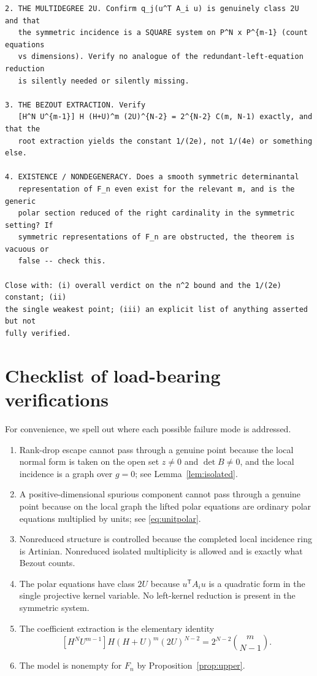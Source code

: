 \documentclass[11pt]{article}
\theoremstyle{plain}
\theoremstyle{definition}
\begin{document}
\begin{verbatim}
2. THE MULTIDEGREE 2U. Confirm q_j(u^T A_i u) is genuinely class 2U and that
   the symmetric incidence is a SQUARE system on P^N x P^{m-1} (count equations
   vs dimensions). Verify no analogue of the redundant-left-equation reduction
   is silently needed or silently missing.

3. THE BEZOUT EXTRACTION. Verify
   [H^N U^{m-1}] H (H+U)^m (2U)^{N-2} = 2^{N-2} C(m, N-1) exactly, and that the
   root extraction yields the constant 1/(2e), not 1/(4e) or something else.

4. EXISTENCE / NONDEGENERACY. Does a smooth symmetric determinantal
   representation of F_n even exist for the relevant m, and is the generic
   polar section reduced of the right cardinality in the symmetric setting? If
   symmetric representations of F_n are obstructed, the theorem is vacuous or
   false -- check this.

Close with: (i) overall verdict on the n^2 bound and the 1/(2e) constant; (ii)
the single weakest point; (iii) an explicit list of anything asserted but not
fully verified.
\end{verbatim}

\section{Checklist of load-bearing verifications}
\label{app:checklist}

For convenience, we spell out where each possible failure mode is addressed.

\begin{enumerate}[leftmargin=2em]
\item Rank-drop escape cannot pass through a genuine point because the local
normal form is taken on the open set $z\ne0$ and $\det B\ne0$, and the local
incidence is a graph over $g=0$; see Lemma~\ref{lem:isolated}.
\item A positive-dimensional spurious component cannot pass through a genuine
point because on the local graph the lifted polar equations are ordinary polar
equations multiplied by units; see \eqref{eq:unitpolar}.
\item Nonreduced structure is controlled because the completed local incidence
ring is Artinian.  Nonreduced isolated multiplicity is allowed and is exactly
what Bezout counts.
\item The polar equations have class $2U$ because $u^{\mathsf T}A_i u$ is a
quadratic form in the single projective kernel variable.  No left-kernel
reduction is present in the symmetric system.
\item The coefficient extraction is the elementary identity
\[
  [H^N U^{m-1}]H(H+U)^m(2U)^{N-2}=2^{N-2}\binom{m}{N-1}.
\]
\item The model is nonempty for $F_n$ by Proposition~\ref{prop:upper}.
\end{enumerate}
\end{document}
